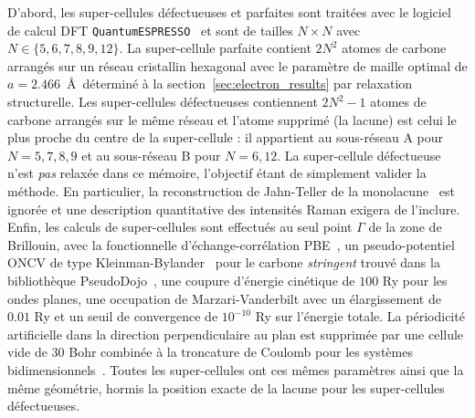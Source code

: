 D'abord, les super-cellules défectueuses et parfaites sont traitées avec le logiciel de calcul DFT \texttt{QuantumESPRESSO}~\cite{giannozziQUANTUMESPRESSOModular2009,giannozziAdvancedCapabilitiesMaterials2017,giannozziQuantumESPRESSOExascale2020} et sont de tailles $N\times N$ avec $N\in\{5, 6, 7, 8, 9, 12\}$. La super-cellule parfaite contient $2N^2$ atomes de carbone arrangés sur un réseau cristallin hexagonal avec le paramètre de maille optimal de $a = 2.466$~\AA~déterminé à la section~\ref{sec:electron_results} par relaxation structurelle. Les super-cellules défectueuses contiennent $2N^2-1$ atomes de carbone arrangés sur le même réseau et l'atome supprimé (la lacune) est celui le plus proche du centre de la super-cellule : il appartient au sous-réseau A pour $N=5, 7, 8, 9$ et au sous-réseau B pour $N=6, 12$. La super-cellule défectueuse n'est \textit{pas} relaxée dans ce mémoire, l'objectif étant de simplement valider la méthode. En particulier, la reconstruction de Jahn-Teller de la monolacune~\cite{el-barbaryStructureEnergeticsVacancy2003} est ignorée et une description quantitative des intensités Raman exigera de l'inclure. Enfin, les calculs de super-cellules sont effectués au seul point $\Gamma$ de la zone de Brillouin, avec la fonctionnelle d'échange-corrélation PBE~\cite{perdewGeneralizedGradientApproximation1996a}, un pseudo-potentiel ONCV de type Kleinman-Bylander~\cite{hamannOptimizedNormconservingVanderbilt2013,kleinmanEfficaciousFormModel1982} pour le carbone \textit{stringent} trouvé dans la bibliothèque PseudoDojo~\cite{vansettenPseudoDojoTrainingGrading2018}, une coupure d'énergie cinétique de $100$ Ry pour les ondes planes, une occupation de Marzari-Vanderbilt avec un élargissement de $0.01$ Ry et un seuil de convergence de $10^{-10}$ Ry sur l'énergie totale. La périodicité artificielle dans la direction perpendiculaire au plan est supprimée par une cellule vide de 30 Bohr combinée à la troncature de Coulomb pour les systèmes bidimensionnels~\cite{sohierDensityFunctionalPerturbation2017}. Toutes les super-cellules ont ces mêmes paramètres ainsi que la même géométrie, hormis la position exacte de la lacune pour les super-cellules défectueuses.


